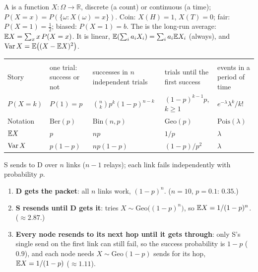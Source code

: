 \begin{defn}
A  is a function $X:\Omega\to\mathbb R$, discrete (a count) or continuous (a time); $P(X=x)=P(\{\omega:X(\omega)=x\})$.
Coin: $X(H)=1$, $X(T)=0$; fair: $P(X=1)=\frac12$; biased: $P(X=1)=b$.
The  is the long-run average: $\mathbb{E} X=\sum_xx\,P(X=x)$. It is linear, $\mathbb{E}(\sum_ia_iX_i)=\sum_ia_i\mathbb{E} X_i$ (always), and $\operatorname{Var} X=\mathbb{E}\big((X-\mathbb{E} X)^2\big)$.
\end{defn}

\begin{center}
\renewcommand{\arraystretch}{1.3}
\small
\begin{tabular}{>{}l L{2.6cm} L{3.1cm} L{3.1cm} L{2.8cm}}
 &  &  &  & \\
\color{surface}Story & one trial: success or not & successes in $n$ independent trials & trials until the first success & events in a period of time\\
\color{surface}$P(X=k)$ & $P(1)=p$ & $\binom nkp^k(1-p)^{n-k}$ & $(1-p)^{k-1}p$, $k\ge1$ & $e^{-\lambda}\lambda^k/k!$\\
\color{surface}Notation & $\text{Ber}(p)$ & $\text{Bin}(n,p)$ & $\text{Geo}(p)$ & $\text{Pois}(\lambda)$\\
\color{surface}$\mathbb{E} X$ & $p$ & $np$ & $1/p$ & $\lambda$\\
\color{surface}$\operatorname{Var} X$ & $p(1-p)$ & $np(1-p)$ & $(1-p)/p^2$ & $\lambda$\\
\end{tabular}
\end{center}

\begin{example}
S sends to D over $n$ links ($n-1$ relays); each link fails independently with probability $p$.
\begin{enumerate}
  \item \textbf{D gets the packet}: all $n$ links work, $(1-p)^n$. ($n=10$, $p=0.1$: $0.35$.)
  \item \textbf{S resends until D gets it}: tries $X\sim\text{Geo}\big((1-p)^n\big)$, so $\mathbb{E} X=1/(1-p)^n$. ($\approx2.87$.)
  \item \textbf{Every node resends to its next hop until it gets through}: only S's single send on the first link can still fail, so the success probability is $1-p$ ($0.9$),
        and each node needs $X\sim\text{Geo}(1-p)$ sends for its hop, $\mathbb{E} X=1/(1-p)$ ($\approx1.11$).
\end{enumerate}
\end{example}

